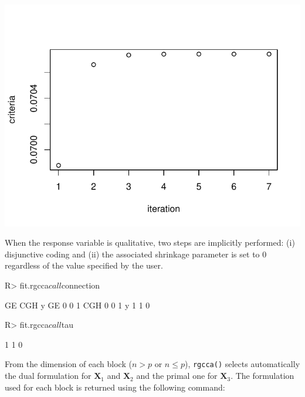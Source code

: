 \documentclass[
]{jss}
\begin{document}
\begin{CodeChunk}
\begin{center}\includegraphics{RGCCA_vignette_files/figure-latex/unnamed-chunk-33-2} \end{center}

\end{CodeChunk}

\normalsize

When the response variable is qualitative, two steps are implicitly
performed: (i) disjunctive coding and (ii) the associated shrinkage
parameter is set to \(0\) regardless of the value specified by the user.

\footnotesize

\begin{CodeChunk}
\begin{CodeInput}
R> fit.rgcca$call$connection
\end{CodeInput}
\begin{CodeOutput}
    GE CGH y
GE   0   0 1
CGH  0   0 1
y    1   1 0
\end{CodeOutput}
\begin{CodeInput}
R> fit.rgcca$call$tau
\end{CodeInput}
\begin{CodeOutput}
[1] 1 1 0
\end{CodeOutput}
\end{CodeChunk}

\normalsize

From the dimension of each block (\(n>p\) or \(n\leq p\)),
\texttt{rgcca()} selects automatically the dual formulation for
\(\mathbf{X}_1\) and \(\mathbf{X}_2\) and the primal one for
\(\mathbf{X}_3\). The formulation used for each block is returned using
the following command:
\end{document}
